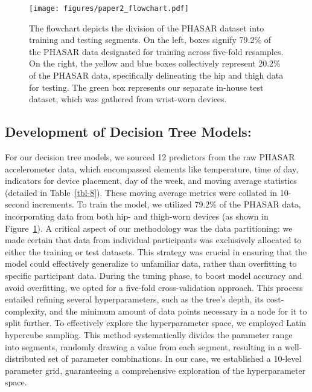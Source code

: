 \documentclass[
  10pt,
]{scrbook}
\begin{document}
\begin{figure}

{\centering \texttt{[image: figures/paper2\_flowchart.pdf]}

}

\caption{\label{fig-paper2_flowchart}The flowchart depicts the division
of the PHASAR dataset into training and testing segments. On the left,
boxes signify 79.2\% of the PHASAR data designated for training across
five-fold resamples. On the right, the yellow and blue boxes
collectively represent 20.2\% of the PHASAR data, specifically
delineating the hip and thigh data for testing. The green box represents
our separate in-house test dataset, which was gathered from wrist-worn
devices.}

\end{figure}

\hypertarget{development-of-decision-tree-models}{%
\subsection{Development of Decision Tree
Models:}\label{development-of-decision-tree-models}}

For our decision tree models, we sourced 12 predictors from the raw
PHASAR accelerometer data, which encompassed elements like temperature,
time of day, indicators for device placement, day of the week, and
moving average statistics (detailed in Table~\ref{tbl-8}). These moving
average metrics were collated in 10-second increments. To train the
model, we utilized 79.2\% of the PHASAR data, incorporating data from
both hip- and thigh-worn devices (as shown in
Figure~\ref{fig-paper2_flowchart}). A critical aspect of our methodology
was the data partitioning: we made certain that data from individual
participants was exclusively allocated to either the training or test
datasets. This strategy was crucial in ensuring that the model could
effectively generalize to unfamiliar data, rather than overfitting to
specific participant data. During the tuning phase, to boost model
accuracy and avoid overfitting, we opted for a five-fold
cross-validation approach. This process entailed refining several
hyperparameters, such as the tree's depth, its cost-complexity, and the
minimum amount of data points necessary in a node for it to split
further. To effectively explore the hyperparameter space, we employed
Latin hypercube sampling. This method systematically divides the
parameter range into segments, randomly drawing a value from each
segment, resulting in a well-distributed set of parameter combinations.
In our case, we established a 10-level parameter grid, guaranteeing a
comprehensive exploration of the hyperparameter space.
\end{document}
